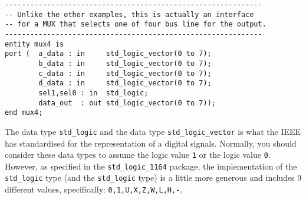 \begin{minipage}{1\linewidth}
\vspace{5pt}
\centering
{}
\begin{lstlisting}[label=entity_3, caption=Entity declaration with bundles.]
-------------------------------------------------------------
-- Unlike the other examples, this is actually an interface
-- for a MUX that selects one of four bus line for the output.
-------------------------------------------------------------
entity mux4 is
port (  a_data : in     std_logic_vector(0 to 7);
        b_data : in     std_logic_vector(0 to 7);
        c_data : in     std_logic_vector(0 to 7);
        d_data : in     std_logic_vector(0 to 7);
        sel1,sel0 : in  std_logic;
        data_out  : out std_logic_vector(0 to 7));
end mux4;
\end{lstlisting}
\end{minipage}
The data type \texttt{std\_logic} and the data type \texttt{std\_logic\_vector} is what the IEEE has standardised for the representation of a digital signals. Normally, you should consider these data types to assume the logic value \texttt{1} or the logic value \texttt{0}. However, as specified in the \texttt{std\_logic\_1164} package, the implementation of the \texttt{std\_logic} type (and the \texttt{std\_logic} type) is a little more generous and includes 9 different values, specifically: \texttt{0,1,U,X,Z,W,L,H,-}. 

